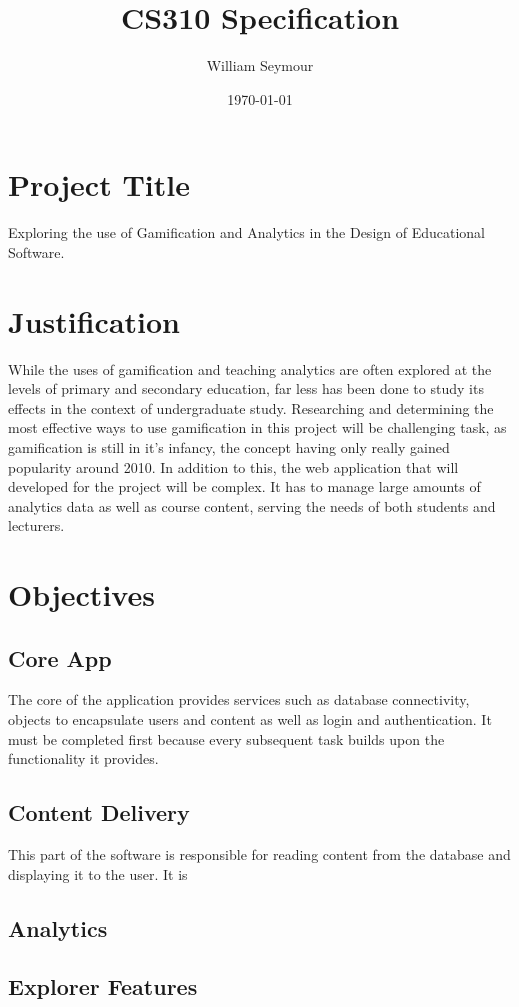 \documentclass{report}
\begin{document}
\title{CS310 Specification}
\author{William Seymour}
\date{\today}
\maketitle

\section*{Project Title}
Exploring the use of Gamification and Analytics in the Design of Educational Software.
\section*{Justification}
While the uses of gamification and teaching analytics are often explored at the levels of primary and secondary education, far less has been done to study its effects in the context of undergraduate study. Researching and determining the most effective ways to use gamification in this project will be challenging task, as gamification is still in it's infancy, the concept having only really gained popularity around 2010. In addition to this, the web application that will developed for the project will be complex. It has to manage large amounts of analytics data as well as course content, serving the needs of both students and lecturers.
\section*{Objectives}
\subsection*{Core App}
The core of the application provides services such as database connectivity, objects to encapsulate users and content as well as login and authentication. It must be completed first because every subsequent task builds upon the functionality it provides.
\subsection*{Content Delivery}
This part of the software is responsible for reading content from the database and displaying it to the user. It is 
\subsection*{Analytics}
\subsection*{Explorer Features}
\end{document}
